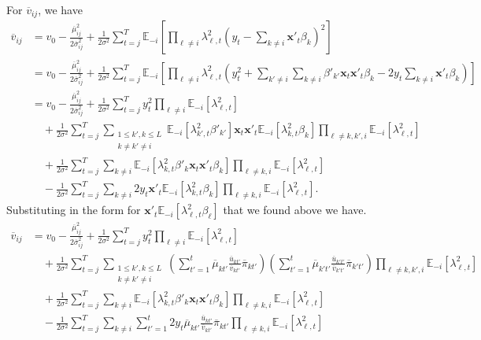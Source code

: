 \documentclass{article}
\newcommand{\E}{\mathbb{E}}
\begin{document}
For $\overline{v}_{ij}$, we have 
\small
\begin{align*}
    \overline{v}_{ij} &= v_0 - \frac{\overline{\mu}_{ij}^2}{2\overline{\sigma}_{ij}^2} + \frac{1}{2\sigma^2} \sum_{t=j}^{T} \E_{-i}\left[\prod_{\ell \neq i} \lambda_{\ell,t}^2\left(y_t - \sum_{k\neq i} \mathbf{x}'_t \beta_k\right)^2\right] \\
    &= v_0 - \frac{\overline{\mu}_{ij}^2}{2\overline{\sigma}_{ij}^2} + \frac{1}{2\sigma^2} \sum_{t=j}^{T} \E_{-i}\left[\prod_{\ell \neq i} \lambda_{\ell,t}^2\left(y^2_t + \sum_{k' \neq i}\sum_{k\neq i} \beta'_{k'}\mathbf{x}_t\mathbf{x}'_t \beta_k - 2 y_t \sum_{k\neq i} \mathbf{x}'_t \beta_k\right)\right] \\
    &= v_0 - \frac{\overline{\mu}_{ij}^2}{2\overline{\sigma}_{ij}^2} + \frac{1}{2\sigma^2} \sum_{t=j}^{T} y^2_t\prod_{\ell \neq i} \E_{-i}\left[\lambda_{\ell,t}^2\right] \\
    &\quad + \frac{1}{2\sigma^2} \sum_{t=j}^{T} \sum_{\substack{1 \leq k',k \leq L \\ k \neq k' \neq i}} \E_{-i}\left[\lambda_{k',t}^2\beta'_{k'}\right]\mathbf{x}_t\mathbf{x}'_t \E_{-i}\left[\lambda_{k,t}^2\beta_k\right] \prod_{\ell \neq k,k',i} \E_{-i}\left[\lambda_{\ell,t}^2\right] \\
    &\quad + \frac{1}{2\sigma^2} \sum_{t=j}^{T} \sum_{k\neq i} \E_{-i}\left[\lambda_{k,t}^2\beta'_{k}\mathbf{x}_t\mathbf{x}'_t \beta_k\right] \prod_{\ell \neq k,i}  \E_{-i}\left[\lambda_{\ell,t}^2\right] \\
    &\quad - \frac{1}{2\sigma^2} \sum_{t=j}^{T} \sum_{k\neq i} 2 y_t \mathbf{x}'_t \E_{-i}\left[\lambda_{k,t}^2\beta_k\right] \prod_{\ell \neq k,i}  \E_{-i}\left[\lambda_{\ell,t}^2\right].
\end{align*}
\normalsize
Substituting in the form for $\mathbf{x}'_t\E_{-i}\left[\lambda_{\ell,t}^2\beta_\ell\right]$ that we found above we have.
\small
\begin{align*}
    \overline{v}_{ij} &= v_0 - \frac{\overline{\mu}_{ij}^2}{2\overline{\sigma}_{ij}^2} + \frac{1}{2\sigma^2} \sum_{t=j}^{T} y^2_t\prod_{\ell \neq i} \E_{-i}\left[\lambda_{\ell,t}^2\right] \\
    &\quad + \frac{1}{2\sigma^2} \sum_{t=j}^{T} \sum_{\substack{1 \leq k',k \leq L \\ k \neq k' \neq i}} \left(\sum_{t'=1}^t\overline{\mu}_{k t'}\frac{\overline{u}_{kt'}}{\overline{v}_{kt'}} \overline{\pi}_{kt'} \right)\left(\sum_{t'=1}^t\overline{\mu}_{k' t'}\frac{\overline{u}_{k't'}}{\overline{v}_{k't'}} \overline{\pi}_{k't'} \right)  \prod_{\ell \neq k,k',i} \E_{-i}\left[\lambda_{\ell,t}^2\right] \\
    &\quad + \frac{1}{2\sigma^2} \sum_{t=j}^{T} \sum_{k\neq i} \E_{-i}\left[\lambda_{k,t}^2\beta'_{k}\mathbf{x}_t\mathbf{x}'_t \beta_k\right] \prod_{\ell \neq k,i}  \E_{-i}\left[\lambda_{\ell,t}^2\right] \\
    &\quad - \frac{1}{2\sigma^2} \sum_{t=j}^{T}\sum_{k\neq i}\sum_{t'=1}^t  2 y_t \overline{\mu}_{k t'}\frac{\overline{u}_{kt'}}{\overline{v}_{kt'}} \overline{\pi}_{kt'} \prod_{\ell \neq k,i}  \E_{-i}\left[\lambda_{\ell,t}^2\right] 
\end{align*}
\end{document}
